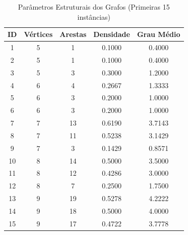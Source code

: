 \begin{table}
\centering
\caption{Parâmetros Estruturais dos Grafos (Primeiras 15 instâncias)}
\label{tab:parametros_grafos_1}
\begin{tabular}{ccccc}
\toprule
ID & Vértices & Arestas & Densidade & Grau Médio \\
\midrule
1 & 5 & 1 & 0.1000 & 0.4000 \\
2 & 5 & 1 & 0.1000 & 0.4000 \\
3 & 5 & 3 & 0.3000 & 1.2000 \\
4 & 6 & 4 & 0.2667 & 1.3333 \\
5 & 6 & 3 & 0.2000 & 1.0000 \\
6 & 6 & 3 & 0.2000 & 1.0000 \\
7 & 7 & 13 & 0.6190 & 3.7143 \\
8 & 7 & 11 & 0.5238 & 3.1429 \\
9 & 7 & 3 & 0.1429 & 0.8571 \\
10 & 8 & 14 & 0.5000 & 3.5000 \\
11 & 8 & 12 & 0.4286 & 3.0000 \\
12 & 8 & 7 & 0.2500 & 1.7500 \\
13 & 9 & 19 & 0.5278 & 4.2222 \\
14 & 9 & 18 & 0.5000 & 4.0000 \\
15 & 9 & 17 & 0.4722 & 3.7778 \\
\bottomrule
\end{tabular}
\end{table}
